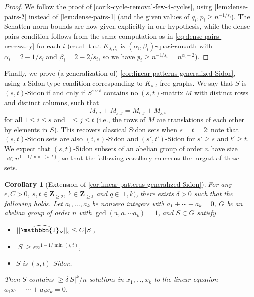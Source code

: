 \documentclass[reqno,11pt]{amsart}
\newtheorem{corollary}[theorem]{Corollary}
\theoremstyle{definition}
\theoremstyle{remark}
\numberwithin{equation}{section}
\newcommand{\Z}{\mathbf{Z}}
\newcommand{\one}{\mathbbm{1}}
\renewcommand{\hat}{\widehat}
\begin{document}
\begin{proof}
We follow the proof of \cref{cor:k-cycle-removal-few-4-cycles}, using \cref{lem:dense-pairs-2} instead of \cref{lem:dense-pairs-1} (and the given values of $q_i, p_i \ge n^{-1/s_i}$). The Schatten norm bounds are now given explicitly in our hypothesis, while the dense pairs condition follows from the same computation as in \cref{eq:dense-pairs-necessary} for each $i$ (recall that $K_{s_i,t_i}$ is $(\alpha_i, \beta_i)$-quasi-smooth \cite{furedi1996upper} with $\alpha_i = 2 - 1/s_i$ and $\beta_i = 2 - 2/s_i$, so we have $p_i \ge n^{-1/s_i} = n^{\alpha_i - 2}$).
\end{proof}

Finally, we prove (a generalization of) \cref{cor:linear-patterns-generalized-Sidon}, using a Sidon-type condition corresponding to $K_{s,t}$-free graphs. We say that $S$ is $(s, t)$-Sidon if and only if $S^{s \times t}$ contains no $(s, t)$-matrix $M$ with distinct rows and distinct columns, such that 
\[
    M_{i,i} + M_{j,j} = M_{i,j} + M_{j,i}
\] 
for all $1 \le i \le s$ and $1 \le j \le t$ (i.e., the rows of $M$ are translations of each other by elements in $S$). This recovers classical Sidon sets when $s = t = 2$; note that $(s, t)$-Sidon sets are also $(t, s)$-Sidon and $(s', t')$-Sidon for $s' \ge s$ and $t' \ge t$. We expect that $(s, t)$-Sidon subsets of an abelian group of order $n$ have size $\ll n^{1 - 1/\min(s, t)}$, so that the following corollary concerns the largest of these sets.

\begin{corollary}[Extension of \cref{cor:linear-patterns-generalized-Sidon}] \label{cor:linear-patterns-st-Sidon}
For any $\epsilon, C > 0$, $s, t \in \Z_{\ge 2}$, $k \in \Z_{\ge 3}$ and $q \in [1, k)$, there exists $\delta > 0$ such that the following holds. Let $a_1, \ldots, a_k$ be nonzero integers with $a_1 + \cdots + a_k = 0$, $G$ be an abelian group of order $n$ with $\gcd(n, a_1 \cdots a_k) = 1$, and $S \subset G$ satisfy
\begin{itemize}
    \item[$(i).$] $||\hat{\one_S}||_q \le C|S|$,
    \item[$(ii).$] $|S| \ge \epsilon n^{1-1/\min(s,t)}$,
    \item[$(iii).$] $S$ is $(s, t)$-Sidon.
\end{itemize}
Then $S$ contains $\ge \delta |S|^k/n$ solutions in $x_1, \ldots, x_k$ to the linear equation $a_1 x_1 + \cdots + a_k x_k = 0$.
\end{corollary}
\end{document}
